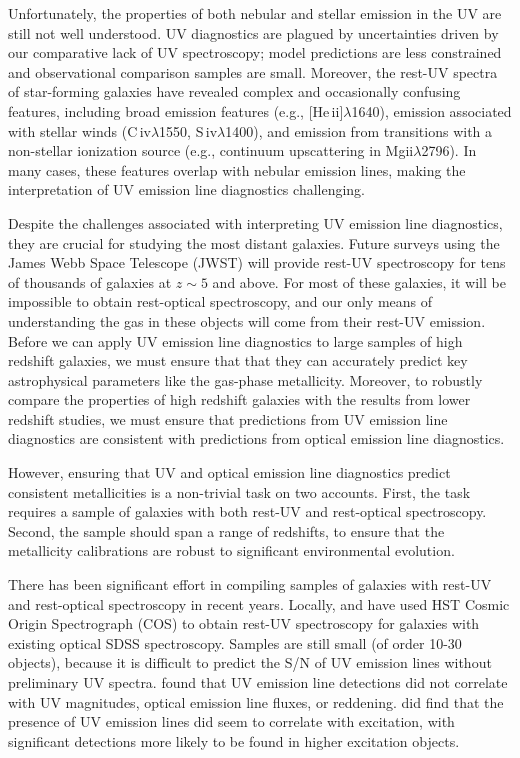 \documentclass[preprint2]{aastex62}
\newcommand{\heii}{[He\,{\sc ii}]\xspace}
\newcommand{\civ}{C\,{\sc iv}\xspace}
\begin{document}
Unfortunately, the properties of both nebular and stellar emission in the UV are still not well understood. UV diagnostics are plagued by uncertainties driven by our comparative lack of UV spectroscopy; model predictions are less constrained and observational comparison samples are small. Moreover, the rest-UV spectra of star-forming galaxies have revealed complex and occasionally confusing features, including broad emission features (e.g., \heii$\lambda$1640), emission associated with stellar winds (\civ$\lambda$1550, {\sc S\,iv}$\lambda$1400), and emission from transitions with a non-stellar ionization source (e.g., continuum upscattering in Mg{\sc ii}$\lambda$2796). In many cases, these features overlap with nebular emission lines, making the interpretation of UV emission line diagnostics challenging.

Despite the challenges associated with interpreting UV emission line diagnostics, they are crucial for studying the most distant galaxies. Future surveys using the James Webb Space Telescope (JWST) will provide rest-UV spectroscopy for tens of thousands of galaxies at $z{\sim}5$ and above. For most of these galaxies, it will be impossible to obtain rest-optical spectroscopy, and our only means of understanding the gas in these objects will come from their rest-UV emission. Before we can apply UV emission line diagnostics to large samples of high redshift galaxies, we must ensure that that they can accurately predict key astrophysical parameters like the gas-phase metallicity. Moreover, to robustly compare the properties of high redshift galaxies with the results from lower redshift studies, we must ensure that predictions from UV emission line diagnostics are consistent with predictions from optical emission line diagnostics.

However, ensuring that UV and optical emission line diagnostics predict consistent metallicities is a non-trivial task on two accounts. First, the task requires a sample of galaxies with both rest-UV and rest-optical spectroscopy. Second, the sample should span a range of redshifts, to ensure that the metallicity calibrations are robust to significant environmental evolution.

There has been significant effort in compiling samples of galaxies with rest-UV and rest-optical spectroscopy in recent years. Locally, \citet{Berg+2016} and \citet{Senchyna+2017} have used HST Cosmic Origin Spectrograph (COS) to obtain rest-UV spectroscopy for galaxies with existing optical SDSS spectroscopy. Samples are still small (of order 10-30 objects), because it is difficult to predict the S/N of UV emission lines without preliminary UV spectra. \citet{Berg+2016} found that UV emission line detections did not correlate with UV magnitudes, optical emission line fluxes, or reddening. \citet{Berg+2016} did find that the presence of UV emission lines did seem to correlate with excitation, with significant detections more likely to be found in higher excitation objects.
\end{document}
